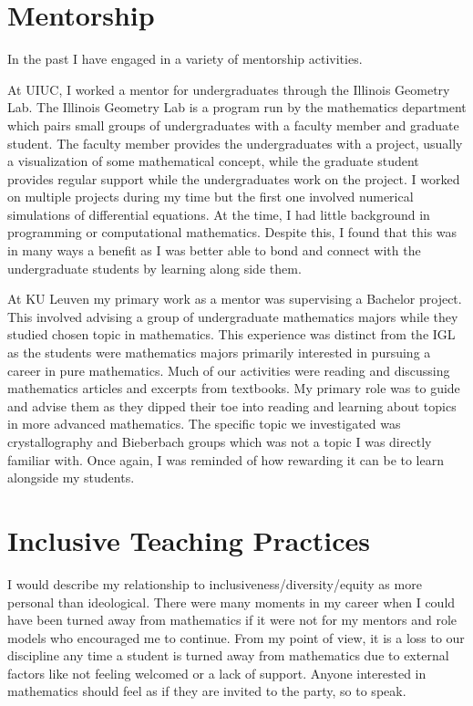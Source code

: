 \documentclass{article}
\begin{document}
\section*{Mentorship}
In the past I have engaged in a variety of mentorship activities. 

At UIUC, I worked a mentor for undergraduates through the Illinois Geometry Lab. The Illinois Geometry Lab is a program run by the mathematics department which pairs small groups of undergraduates with a faculty member and graduate student. The faculty member provides the undergraduates with a project, usually a visualization of some mathematical concept, while the graduate student provides regular support while the undergraduates work on the project. I worked on multiple projects during my time but the first one involved numerical simulations of differential equations. At the time, I had little background in programming or computational mathematics. Despite this, I found that this was in many ways a benefit as I was better able to bond and connect with the undergraduate students by learning along side them. 

At KU Leuven my primary work as a mentor was supervising a Bachelor project. This involved advising a group of undergraduate mathematics majors while they studied chosen topic in mathematics. This experience was distinct from the IGL as the students were mathematics majors primarily interested in pursuing a career in pure mathematics. Much of our activities were reading and discussing mathematics articles and excerpts from textbooks. My primary role was to guide and advise them as they dipped their toe into reading and learning about topics in more advanced mathematics. The specific topic we investigated was crystallography and Bieberbach groups which was not a topic I was directly familiar with. Once again, I was reminded of how rewarding it can be to learn alongside my students.

\section*{Inclusive Teaching Practices}

I would describe my relationship to inclusiveness/diversity/equity as more personal than ideological. There were many moments in my career when I could have been turned away from mathematics if it were not for my mentors and role models who encouraged me to continue. From my point of view, it is a loss to our discipline any time a student is turned away from mathematics due to external factors like not feeling welcomed or a lack of support. Anyone interested in mathematics should feel as if they are invited to the party, so to speak.
\end{document}
